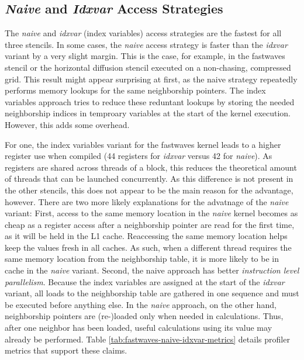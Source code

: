 \subsection{\emph{Naive} and \emph{Idxvar} Access Strategies}
The \emph{naive} and \emph{idxvar} (index variables) access strategies are the fastest for all three stencils. In some cases, the \emph{naive} access strategy is faster than the \emph{idxvar} variant by a very slight margin. This is the case, for example, in the fastwaves stencil or the horizontal diffusion stencil executed on a non-chasing, compressed grid. This result might appear surprising at first, as the naive strategy repeatedly performs memory lookups for the same neighborship pointers. The index variables approach tries to reduce these reduntant lookups by storing the needed neighborship indices in temproary variables at the start of the kernel execution. However, this adds some overhead.

For one, the index variables variant for the fastwaves kernel leads to a higher register use when compiled (44 registers for \emph{idxvar} versus 42 for \emph{naive}). As registers are shared across threads of a block, this reduces the theoretical amount of threads that can be launched concurrently. As this difference is not present in the other stencils, this does not appear to be the main reason for the advantage, however. There are two more likely explanations for the advatnage of the \emph{naive} variant: First, access to the same memory location in the \emph{naive} kernel becomes as cheap as a register access after a neighborship pointer are read for the first time, as it will be held in the L1 cache. Reaccessing the same memory location helps keep the values fresh in all caches. As such, when a different thread requires the same memory location from the neighborship table, it is more likely to be in cache in the \emph{naive} variant. Second, the naive approach has better \emph{instruction level parallelism}. Because the index variables are assigned at the start of the \emph{idxvar} variant, all loads to the neighborship table are gathered in one sequence and must be executed before anything else. In the \emph{naive} approach, on the other hand, neighborship pointers are (re-)loaded only when needed in calculations. Thus, after one neighbor has been loaded, useful calculations using its value may already be performed. Table \ref{tab:fastwaves-naive-idxvar-metrics} details profiler metrics that support these claims.


